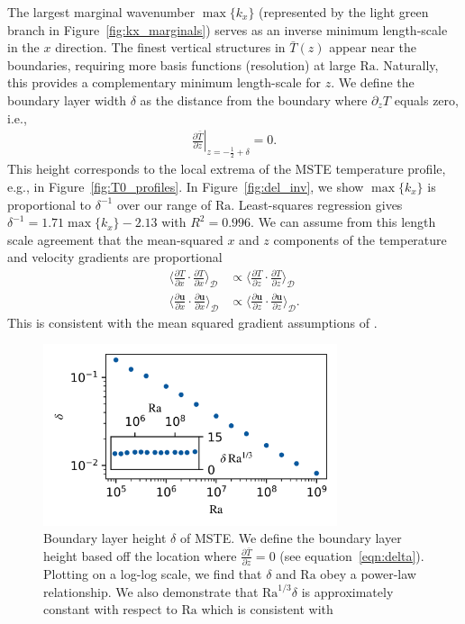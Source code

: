 \documentclass[reprint,amsmath,amssymb,aps]{revtex4-1}
\newcommand\Ra{\mathrm{Ra}}
\renewcommand{\vec}[1]{\boldsymbol{#1}}
\begin{document}
The largest marginal wavenumber $\max \{ k_x \}$ (represented by the light green branch in Figure~\ref{fig:kx_marginals}) serves as an inverse minimum length-scale in the $x$ direction.
The finest vertical structures in $\bar{T}(z)$ appear near the boundaries, requiring more basis functions (resolution) at large $\Ra$.
Naturally, this provides a complementary minimum length-scale for $z$.
We define the boundary layer width $\delta$ as the distance from the boundary where $\partial_z T$ equals zero, i.e.,
\begin{align}\label{eqn:delta}
\left.\frac{\partial \bar{T}}{\partial z}\right|_{z=-\frac{1}{2}+\delta} = 0.
\end{align}
This height corresponds to the local extrema of the MSTE temperature profile, e.g., in Figure~\ref{fig:T0_profiles}.
In Figure~\ref{fig:del_inv}, we show $\max \{ k_x\}$ is proportional to $\delta^{-1}$ over our range of $\Ra$.
Least-squares regression gives $\delta^{-1} = 1.71 \max \{ k_x \} - 2.13$ with $R^2 = 0.996$.
We can assume from this length scale agreement that the mean-squared $x$ and $z$ components of the temperature and velocity gradients are proportional
\begin{align}
    \Big\langle \frac{\partial T}{\partial x} \cdot \frac{\partial T}{\partial x} \Big\rangle_{\mathcal{D}} &\propto \Big\langle \frac{\partial T}{\partial z} \cdot \frac{\partial T}{\partial z} \Big\rangle_{\mathcal{D}} \nonumber   \\
    \Big\langle \frac{\partial \vec{u}}{\partial x} \cdot \frac{\partial \vec{u}}{\partial x} \Big\rangle_{\mathcal{D}} &\propto \Big\langle \frac{\partial \vec{u}}{\partial z} \cdot \frac{\partial \vec{u}}{\partial z} \Big\rangle_{\mathcal{D}}.
\end{align}
This is consistent with the mean squared gradient assumptions of \cite{Malkus_1954}.

\begin{figure}
    \centering
    \includegraphics[width=3.4in]{del_ra.PNG}
    \caption{Boundary layer height $\delta$ of MSTE. 
    We define the boundary layer height based off the location where $\frac{\partial \bar{T}}{\partial z} = 0$ (see equation~\ref{eqn:delta}). 
    Plotting on a log-log scale, we find that $\delta$ and $\Ra$ obey a power-law relationship. We also demonstrate that $\Ra^{1/3}\delta$ is approximately constant with respect to $\Ra$ which is consistent with \cite{Malkus_1954}}
    \label{fig:bl_ra}
\end{figure}
\end{document}

